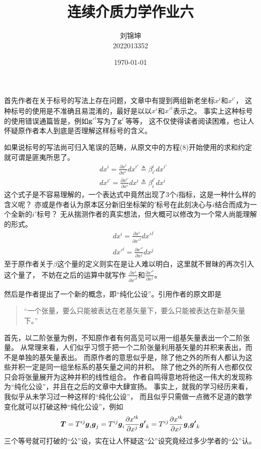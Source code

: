 \documentclass[UTF8]{ctexart}
\title{连续介质力学作业六}
\author{刘锦坤\\2022013352}
\date{\today}
\begin{document}
\maketitle

首先作者在关于标号的写法上存在问题，文章中有提到两组新老坐标$x^i$和$x^{i'}$，
这种标号的使用是不准确且易混淆的，最好是以以$x^i$和$x'^i$表示之。
事实上这种标号的使用错误通篇皆是，例如$\boldsymbol g'^i$写为了$\boldsymbol g^{i'}$等等，
这不仅使得读者阅读困难，也让人怀疑原作者本人到底是否理解这样标号的含义。

如果说标号的写法尚可归入笔误的范畴，从原文中的方程(8)开始使用的求和约定就可谓是匪夷所思了。
\begin{equation}
    \begin{aligned}
    &dx^i=\frac{\partial x^i}{\partial x^{i'}}dx^{i'} \triangleq \beta^i_{i'}dx^{i'}\\
    &dx^{i'}=\frac{\partial x^{i'}}{\partial x^i}dx^i \triangleq \beta^{i'}_{i}dx^i
    \end{aligned}
    \tag*{(8)}
\end{equation}
这个式子是不容易理解的，一个表达式中竟然出现了3个$i$指标，这是一种什么样的含义呢？
亦或是作者认为原本区分新旧坐标架的$'$标号在此刻决心与$i$结合而成为一个全新的$i'$标号？
无从揣测作者的真实想法，但大概可以修改为一个常人尚能理解的形式。
\begin{equation}
    \begin{aligned}
    &dx^i=\frac{\partial x^i}{\partial x'^{j}}dx'^{j}\\
    &dx'^i=\frac{\partial x'^i}{\partial x^j}dx^j
    \end{aligned}
    \tag*{(8')}
\end{equation}
至于原作者关于$\beta$这个量的定义则实在是让人难以明白，这里就不冒昧的再次引入这个量了，
不妨在之后的运算中就写作
$\frac{\partial x^i}{\partial x'^{j}}$和$\frac{\partial x'^i}{\partial x^j}$。

然后是作者提出了一个新的概念，即“纯化公设”。引用作者的原文即是
\begin{quote}
    “一个张量，要么只能被表达在老基矢量下，要么只能被表达在新基矢量下。”
\end{quote}
首先，以二阶张量为例，不知原作者有何高见可以用一组基矢量表出一个二阶张量。
从常理来看，人们似乎习惯于把一个二阶张量利用基矢量的并积来表出，而不是单独的基矢量表出。
而原作者的意思似乎是，除了他之外的所有人都认为这些并积一定是同一组坐标系的基矢量之间的并积。
除了他之外的所有人也都仅仅只会将张量展开为这种并积的线性组合。
作者自鸣得意地将他这一伟大的发现称为“纯化公设”，并且在之后的文章中大肆宣扬。
事实上，就我的学习经历来看，我似乎从未学习过一种这样的“纯化公设”，
而且似乎只需做一点微不足道的数学变化就可以打破这种“纯化公设”，例如
\begin{equation}
    \boldsymbol {T}
    = T^{ij}\boldsymbol {g}_i \boldsymbol {g}_{j}
    =T^{ij}\boldsymbol {g}_i \frac{\partial x'^k}{\partial x^j}\boldsymbol {g'}_{k}
    =T^{ij} \frac{\partial x'^k}{\partial x^j} \boldsymbol {g}_i \boldsymbol {g'}_{k}
    \notag{}
\end{equation}
三个等号就可打破的“公”设，实在让人怀疑这“公”设究竟经过多少学者的“公”认。
\end{document}
